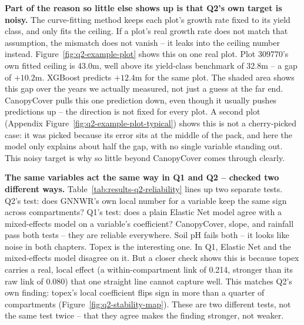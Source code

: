 \textbf{Part of the reason so little else shows up is that Q2's own target is noisy.} The curve-fitting method keeps each plot's growth rate fixed to its yield class, and only fits the ceiling. If a plot's real growth rate does not match that assumption, the mismatch does not vanish -- it leaks into the ceiling number instead. Figure~\ref{fig:q2-example-plot} shows this on one real plot. Plot 309770's own fitted ceiling is 43.0m, well above its yield-class benchmark of 32.8m -- a gap of $+10.2$m. XGBoost predicts $+12.4$m for the same plot. The shaded area shows this gap over the years we actually measured, not just a guess at the far end. CanopyCover pulls this one prediction down, even though it usually pushes predictions up -- the direction is not fixed for every plot. A second plot (Appendix Figure~\ref{fig:q2-example-plot-typical}) shows this is not a cherry-picked case: it was picked because its error sits at the middle of the pack, and here the model only explains about half the gap, with no single variable standing out. This noisy target is why so little beyond CanopyCover comes through clearly.


\textbf{The same variables act the same way in Q1 and Q2 -- checked two different ways.} Table~\ref{tab:results-q2-reliability} lines up two separate tests. Q2's test: does GNNWR's own local number for a variable keep the same sign across compartments? Q1's test: does a plain Elastic Net model agree with a mixed-effects model on a variable's coefficient? CanopyCover, slope, and rainfall pass both tests -- they are reliable everywhere. Soil pH fails both -- it looks like noise in both chapters. Topex is the interesting one. In Q1, Elastic Net and the mixed-effects model disagree on it. But a closer check shows this is because topex carries a real, local effect (a within-compartment link of 0.214, stronger than its raw link of 0.080) that one straight line cannot capture well. This matches Q2's own finding: topex's local coefficient flips sign in more than a quarter of compartments (Figure~\ref{fig:q2-stability-map}). These are two different tests, not the same test twice -- that they agree makes the finding stronger, not weaker.

